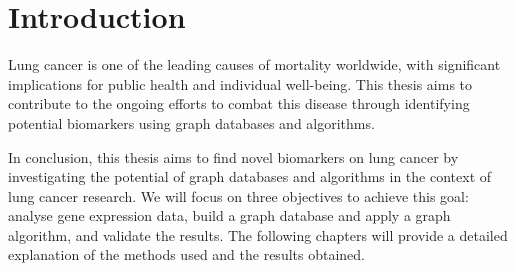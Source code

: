 \section{Introduction} \label{sec:intro}
Lung cancer is one of the leading causes of mortality worldwide, with significant implications for public health and individual well-being.
This thesis aims to contribute to the ongoing efforts to combat this disease through
identifying potential biomarkers using graph databases and algorithms.











In conclusion, this thesis aims to find novel biomarkers on lung cancer
by investigating the potential of graph databases and algorithms in the context of lung cancer research.
We will focus on three objectives to achieve this goal:
analyse gene expression data, build a graph database and apply a graph algorithm, and validate the results.
The following chapters will provide a detailed explanation of the methods used and the results obtained.